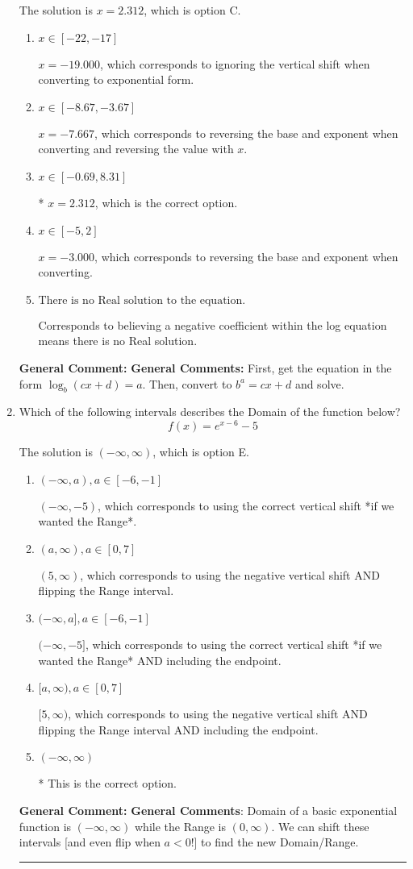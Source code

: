 \documentclass{extbook}[14pt]
\newcommand{\litem}[1]{\item #1

\rule{\textwidth}{0.4pt}}
\begin{document}
\begin{enumerate}
{The solution is \( x = 2.312 \), which is option C.\begin{enumerate}[label=\Alph*.]
\item \( x \in [-22, -17] \)

$x = -19.000$, which corresponds to ignoring the vertical shift when converting to exponential form.
\item \( x \in [-8.67, -3.67] \)

$x = -7.667$, which corresponds to reversing the base and exponent when converting and reversing the value with $x$.
\item \( x \in [-0.69, 8.31] \)

* $x = 2.312$, which is the correct option.
\item \( x \in [-5, 2] \)

$x = -3.000$, which corresponds to reversing the base and exponent when converting.
\item \( \text{There is no Real solution to the equation.} \)

Corresponds to believing a negative coefficient within the log equation means there is no Real solution.
\end{enumerate}

\textbf{General Comment:} \textbf{General Comments:} First, get the equation in the form $\log_b{(cx+d)} = a$. Then, convert to $b^a = cx+d$ and solve.
}
\litem{
Which of the following intervals describes the Domain of the function below?
\[ f(x) = e^{x-6}-5 \]

The solution is \( (-\infty, \infty) \), which is option E.\begin{enumerate}[label=\Alph*.]
\item \( (-\infty, a), a \in [-6, -1] \)

$(-\infty, -5)$, which corresponds to using the correct vertical shift *if we wanted the Range*.
\item \( (a, \infty), a \in [0, 7] \)

$(5, \infty)$, which corresponds to using the negative vertical shift AND flipping the Range interval.
\item \( (-\infty, a], a \in [-6, -1] \)

$(-\infty, -5]$, which corresponds to using the correct vertical shift *if we wanted the Range* AND including the endpoint.
\item \( [a, \infty), a \in [0, 7] \)

$[5, \infty)$, which corresponds to using the negative vertical shift AND flipping the Range interval AND including the endpoint.
\item \( (-\infty, \infty) \)

* This is the correct option.
\end{enumerate}

\textbf{General Comment:} \textbf{General Comments}: Domain of a basic exponential function is $(-\infty, \infty)$ while the Range is $(0, \infty)$. We can shift these intervals [and even flip when $a<0$!] to find the new Domain/Range.
}
\end{enumerate}
\end{document}
